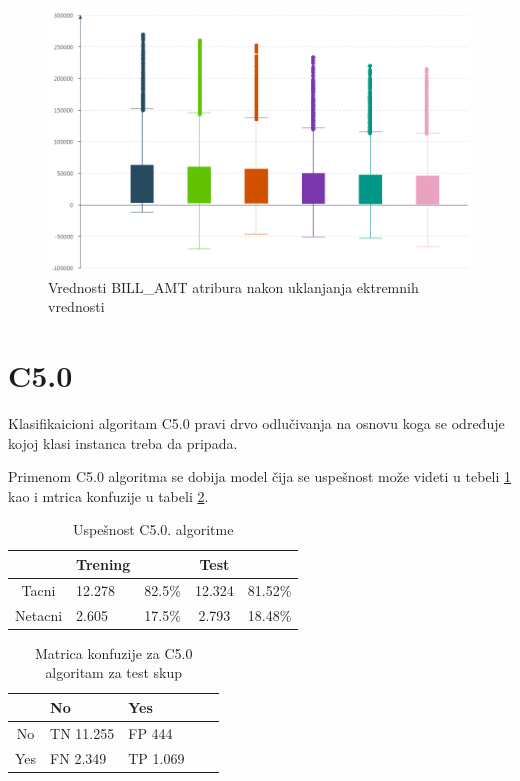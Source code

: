 \documentclass[a4paper]{article}
\begin{document}
\begin{figure}[h!]
\begin{center}
    \includegraphics[scale=0.5]{bill_amt_coerce.png}
    \caption{Vrednosti BILL\_AMT atribura nakon uklanjanja ektremnih vrednosti}
    \label{fig:BILL_AMT_nakon}
\end{center}
\end{figure}


\clearpage
\section{C5.0}	
\label{sec:c5.0}

Klasifikaicioni algoritam C5.0 pravi drvo odlučivanja na osnovu koga se određuje kojoj klasi instanca treba da pripada.

Primenom C5.0 algoritma se dobija model čija se uspešnost može videti u tebeli \ref{tab:tabelaC5} kao i mtrica konfuzije u tabeli \ref{tab:tabelaC5matricaKonfuzije}.

\begin{table}[h!]
\begin{center}
\caption{Uspešnost C5.0. algoritme}
\begin{tabular}{|c|l|r|c|c|} \hline
& Trening& & Test & \\ \hline
Tacni &12.278 &82.5\% &12.324 &81.52\% \\ \hline
Netacni &2.605 &17.5\% &2.793 &18.48\% \\ \hline
\end{tabular}
\label{tab:tabelaC5}
\end{center}
\end{table}

\begin{table}[h!]
\begin{center}
\caption{Matrica konfuzije za C5.0 algoritam za test skup}
\begin{tabular}{|c|l|l|l|l|} \hline
& No& Yes \\ \hline
No &TN 11.255 &FP 444 \\ \hline
Yes &FN 2.349 &TP 1.069  \\ \hline
\end{tabular}
\label{tab:tabelaC5matricaKonfuzije}
\end{center}
\end{table}
\end{document}
